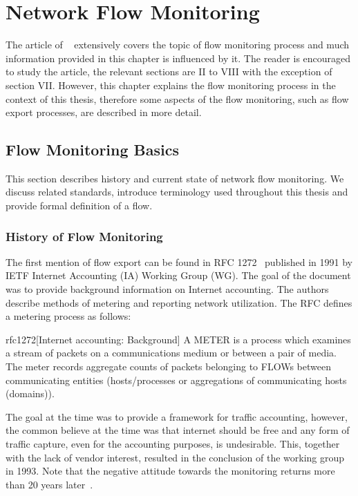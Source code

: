 \chapter{Network Flow Monitoring}

The article of \citeauthor{Hofstede-2014-Flow}~\cite{Hofstede-2014-Flow} extensively covers the topic of flow monitoring process and much information provided in this chapter is influenced by it. The reader is encouraged to study the article, the relevant sections are II to VIII with the exception of section VII. However, this chapter explains the flow monitoring process in the context of this thesis, therefore some aspects of the flow monitoring, such as flow export processes, are described in more detail.

\section{Flow Monitoring Basics}

This section describes history and current state of network flow monitoring. We discuss related standards, introduce terminology used throughout this thesis and provide formal definition of a flow. 

\subsection{History of Flow Monitoring}\label{subsec:history-of-flow-monitoring}

The first mention of flow export can be found in RFC 1272~\cite{rfc1272} published in 1991 by IETF Internet Accounting (IA) Working Group (WG). The goal of the document was to provide background information on Internet accounting. The authors describe methods of metering and reporting network utilization. The RFC defines a metering process as follows:

\begin{displaycquote}{rfc1272}[Internet accounting: Background]
A METER is a process which examines a stream of packets on a communications medium or between a pair of media. The meter records  aggregate counts of packets belonging to FLOWs between communicating entities (hosts/processes or aggregations of communicating hosts (domains)).
\end{displaycquote}

The goal at the time was to provide a framework for traffic accounting, however, the common believe at the time was that internet should be free and any form of traffic capture, even for the accounting purposes, is undesirable. This, together with the lack of vendor interest, resulted in the conclusion of the working group in 1993. Note that the negative attitude towards the monitoring returns more than 20 years later~\cite{rfc7258}.

